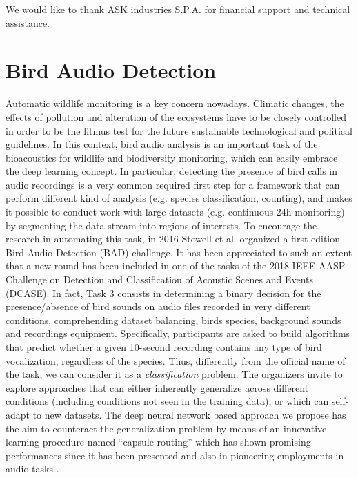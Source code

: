 We would like to thank ASK industries S.P.A. for financial support and technical assistance.


\newpage

\section{Bird Audio Detection}
\label{sec:bad}

Automatic wildlife monitoring is a key concern nowadays. Climatic changes, the effects of pollution and alteration of the ecosystems have to be closely controlled in order to be the litmus test for the future sustainable technological and political guidelines.
In this context, bird audio analysis is an important task of the bioacoustics for wildlife and biodiversity monitoring, which can easily embrace the deep learning concept.
In particular, detecting the presence of bird calls in audio recordings is a very common required first step for a framework that can perform different kind of  analysis (e.g. species classification, counting), and makes it possible to conduct work with large datasets (e.g. continuous 24h monitoring) by segmenting the data stream into regions of interests.
To encourage the research in automating this task, in 2016 Stowell et al. \cite{stowell2016bird} organized a first edition Bird Audio Detection (BAD) challenge. It has been appreciated to such an extent that a new round has been included in one of the tasks of the 2018 IEEE AASP Challenge on Detection and Classification of Acoustic Scenes and Events (DCASE). In fact, Task 3 consists in determining a binary decision for the presence/absence of bird sounds on audio files recorded in very different conditions, comprehending dataset balancing, birds species, background sounds and recordings equipment.
Specifically, participants are asked to build algorithms that predict whether a given 10-second recording contains any type of bird vocalization, regardless of the species. Thus, differently from the official name of the task, we can consider it as a \textit{classification} problem.
The organizers invite to explore approaches that can either inherently generalize across different conditions (including conditions not seen in the training data), or which can self-adapt to new datasets. The deep neural network based approach we propose has the aim to counteract the generalization problem by means of an innovative learning procedure named ``capsule routing'' which has shown promising performances since it has been presented \cite{sabour2017dynamic} and also in pioneering employments in audio tasks \cite{iqbal2018capsule}.


